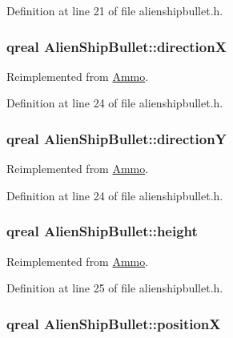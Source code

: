 Definition at line 21 of file alienshipbullet.h.\hypertarget{class_alien_ship_bullet_ac5b78fb52df900ec79a2c480410dc3ca}{
\subsubsection[{directionX}]{\setlength{\rightskip}{0pt plus 5cm}qreal {\bf AlienShipBullet::directionX}}}
\label{class_alien_ship_bullet_ac5b78fb52df900ec79a2c480410dc3ca}


Reimplemented from \hyperlink{class_ammo_a60392d67523d0cf6d46e14b6b3f1ae05}{Ammo}.

Definition at line 24 of file alienshipbullet.h.\hypertarget{class_alien_ship_bullet_a807486b1f3903b772f6d31294b258edb}{
\subsubsection[{directionY}]{\setlength{\rightskip}{0pt plus 5cm}qreal {\bf AlienShipBullet::directionY}}}
\label{class_alien_ship_bullet_a807486b1f3903b772f6d31294b258edb}


Reimplemented from \hyperlink{class_ammo_a1156ff1439690bf121841528585aa026}{Ammo}.

Definition at line 24 of file alienshipbullet.h.\hypertarget{class_alien_ship_bullet_a6323f9356a3f49ec9d3838203f806702}{
\subsubsection[{height}]{\setlength{\rightskip}{0pt plus 5cm}qreal {\bf AlienShipBullet::height}}}
\label{class_alien_ship_bullet_a6323f9356a3f49ec9d3838203f806702}


Reimplemented from \hyperlink{class_ammo_a7ee07e5c3778fe15aeef8126a5251e3b}{Ammo}.

Definition at line 25 of file alienshipbullet.h.\hypertarget{class_alien_ship_bullet_a961d9fe7f586e37bb06f0a1d5f6c5923}{
\subsubsection[{positionX}]{\setlength{\rightskip}{0pt plus 5cm}qreal {\bf AlienShipBullet::positionX}}}
\label{class_alien_ship_bullet_a961d9fe7f586e37bb06f0a1d5f6c5923}


